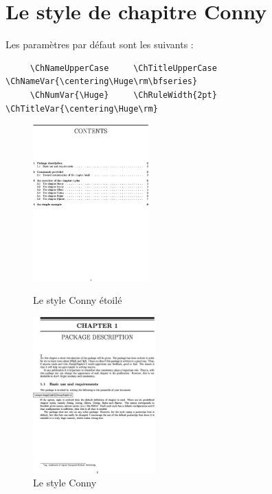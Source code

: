 \documentclass{report}
\begin{document}
    \section{Le style de chapitre Conny}
    Les paramètres par défaut sont les suivants :
    {\small\begin{verbatim}
     \ChNameUpperCase     \ChTitleUpperCase    \ChNameVar{\centering\Huge\rm\bfseries}
     \ChNumVar{\Huge}     \ChRuleWidth{2pt}    \ChTitleVar{\centering\Huge\rm}
    \end{verbatim}}
    \begin{figure}[h]
      \begin{minipage}{7 cm}
        \centerline{\includegraphics[height=6cm]{Connys.eps}}
        \caption{Le style Conny \og étoilé \fg{}}
      \end{minipage}\hfill
      \begin{minipage}{7 cm}
        \centerline{\includegraphics[height=6cm]{Conny.eps}}
        \caption{Le style Conny}
      \end{minipage}\hfill
    \end{figure}
\end{document}
